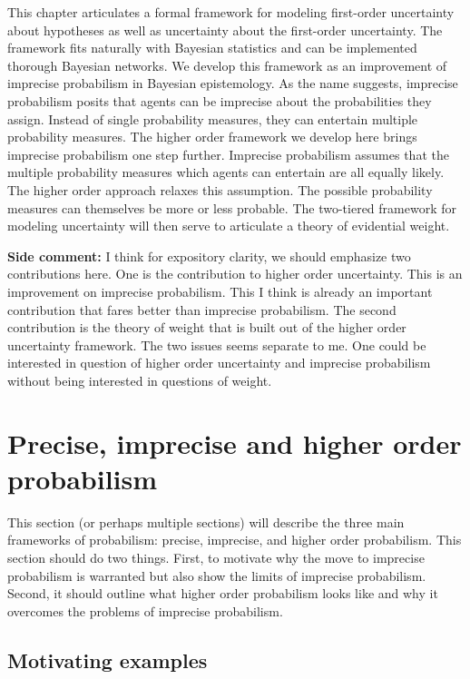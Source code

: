 \documentclass[
  10pt,
  dvipsnames,enabledeprecatedfontcommands]{scrartcl}
\begin{document}
This chapter articulates a formal framework for modeling first-order
uncertainty about hypotheses as well as uncertainty about the
first-order uncertainty. The framework fits naturally with Bayesian
statistics and can be implemented thorough Bayesian networks. We develop
this framework as an improvement of imprecise probabilism in Bayesian
epistemology. As the name suggests, imprecise probabilism posits that
agents can be imprecise about the probabilities they assign. Instead of
single probability measures, they can entertain multiple probability
measures. The higher order framework we develop here brings imprecise
probabilism one step further. Imprecise probabilism assumes that the
multiple probability measures which agents can entertain are all equally
likely. The higher order approach relaxes this assumption. The possible
probability measures can themselves be more or less probable. The
two-tiered framework for modeling uncertainty will then serve to
articulate a theory of evidential weight.

\textbf{Side comment:} I think for expository clarity, we should
emphasize two contributions here. One is the contribution to higher
order uncertainty. This is an improvement on imprecise probabilism. This
I think is already an important contribution that fares better than
imprecise probabilism. The second contribution is the theory of weight
that is built out of the higher order uncertainty framework. The two
issues seems separate to me. One could be interested in question of
higher order uncertainty and imprecise probabilism without being
interested in questions of weight.

\hypertarget{precise-imprecise-and-higher-order-probabilism}{%
\section{Precise, imprecise and higher order
probabilism}\label{precise-imprecise-and-higher-order-probabilism}}

This section (or perhaps multiple sections) will describe the three main
frameworks of probabilism: precise, imprecise, and higher order
probabilism. This section should do two things. First, to motivate why
the move to imprecise probabilism is warranted but also show the limits
of imprecise probabilism. Second, it should outline what higher order
probabilism looks like and why it overcomes the problems of imprecise
probabilism.

\hypertarget{motivating-examples}{%
\subsection{Motivating examples}\label{motivating-examples}}
\end{document}
